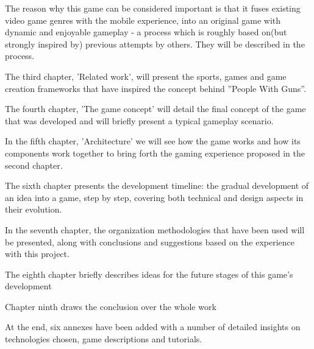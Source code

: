 The reason why this game can be considered important is that it fuses existing
video game genres with the mobile experience, into an original game with dynamic
and enjoyable gameplay - a process which is roughly based on(but strongly
inspired by) previous attempts by others. They will be described in the
process.\newline

The third chapter, 'Related work', will present the sports, games and game
creation frameworks that have inspired the concept behind ''People With Guns''.
\newline

The fourth chapter, 'The game concept' will detail the final concept of the game
that was developed and will briefly present a typical gameplay scenario.\newline

In the fifth chapter, 'Architecture' we will see how the game works and how its
components work together to bring forth the gaming experience proposed in the
second chapter.\newline

The sixth chapter presents the development timeline: the gradual development of
an idea into a game, step by step, covering both technical and design aspects in
their evolution.\newline

In the seventh chapter, the organization methodologies that have been used will
be presented, along with conclusions and suggestions based on the experience with
this project.\newline

The eighth chapter briefly describes ideas for the future stages of this game's
development\newline

Chapter ninth draws the conclusion over the whole work\newline

At the end, six annexes have been added with a number of detailed insights on
technologies chosen, game descriptions and tutorials.